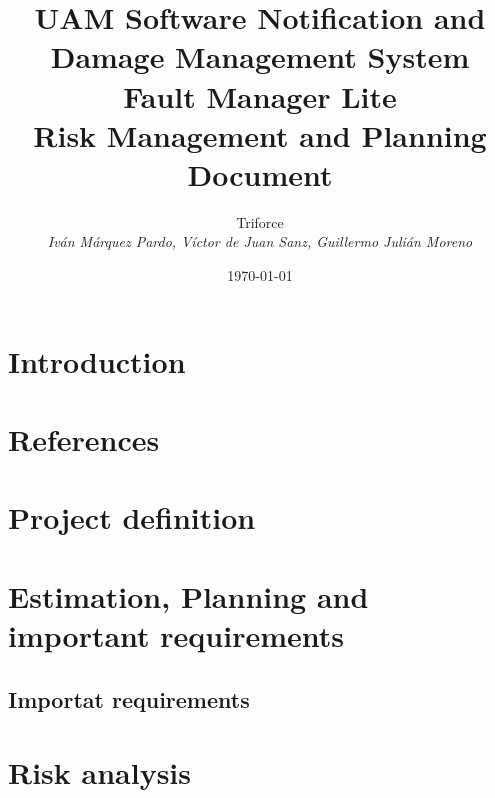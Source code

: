 \documentclass[11pt]{report}
\title{UAM Software Notification and Damage Management System \\ Fault Manager Lite \\ Risk Management and Planning Document}
\date{\today}
\author{{\Large Triforce} \\ \vspace{5pt} \textit{Iván Márquez Pardo, Víctor de Juan Sanz, Guillermo Julián Moreno}}
\begin{document}
\maketitle
\tableofcontents
\newpage
\chapter{Introduction}

\chapter{References}

\chapter{Project definition}
\label{chapDef}



\chapter{Estimation, Planning and important requirements}
\label{chapPlan}


\section{Importat requirements}


\chapter{Risk analysis}


\end{document}
